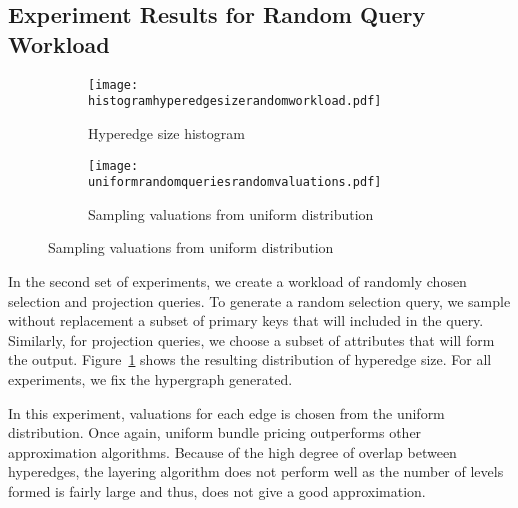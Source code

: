\subsection{Experiment Results for Random Query Workload}

\begin{figure*}[t]
	\begin{subfigure}{0.45\textwidth} 
		\hspace{-20mm}
		\texttt{[image: histogramhyperedgesizerandomworkload.pdf]}
		\caption{Hyperedge size histogram} \label{fig:randomquerieshistogram}
	\end{subfigure} 
	\begin{subfigure}{0.45\textwidth} 
		\texttt{[image: uniformrandomqueriesrandomvaluations.pdf]}
		\caption{Sampling valuations from uniform distribution} \label{fig:uniformapproxrandom}
	\end{subfigure} 
	\caption{Sampling valuations from uniform distribution}
\end{figure*}



In the second set of experiments, we create a workload of randomly chosen selection and projection queries. To generate a random selection query, we  sample without replacement a subset of primary keys that will included in the query. Similarly, for projection queries, we choose a subset of attributes that will form the output. Figure~\ref{fig:randomquerieshistogram} shows the resulting distribution of hyperedge size. For all experiments, we fix the hypergraph generated. 

\smallskip
{} In this experiment, valuations for each edge is chosen from the uniform distribution. Once again, uniform bundle pricing outperforms other approximation algorithms. Because of the high degree of overlap between hyperedges, the layering algorithm does not perform well as the number of levels formed is fairly large and thus, does not give a good approximation.